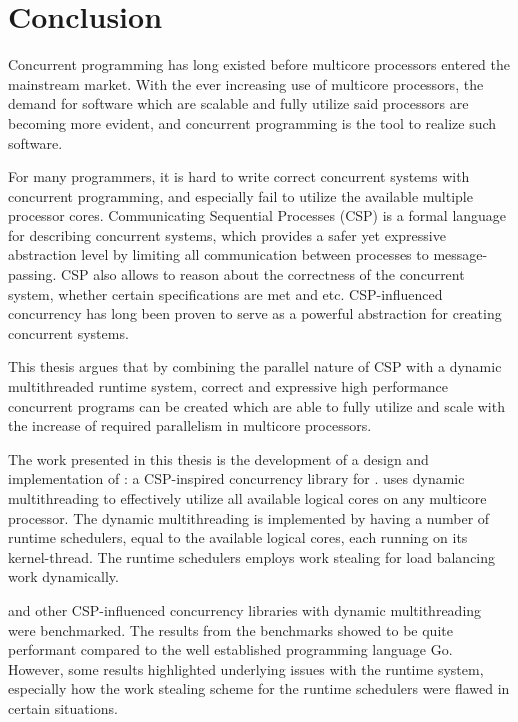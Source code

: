 

\chapter{Conclusion}
\label{ch:conclusion}

Concurrent programming has long existed before multicore processors entered the mainstream market. With the ever increasing use of multicore processors, the demand for software which are scalable and fully utilize said processors are becoming more evident, and concurrent programming is the tool to realize such software.

For many programmers, it is hard to write correct concurrent systems with concurrent programming, and especially fail to utilize the available multiple processor cores. Communicating Sequential Processes (CSP) is a formal language for describing concurrent systems, which provides a safer yet expressive abstraction level by limiting all communication between processes to message\hyp{}passing. CSP also allows to reason about the correctness of the concurrent system, whether certain specifications are met and etc. CSP\hyp{}influenced concurrency has long been proven to serve as a powerful abstraction for creating concurrent systems.

This thesis argues that by combining the parallel nature of CSP with a dynamic multithreaded runtime system, correct and expressive high performance concurrent programs can be created which are able to fully utilize and scale with the increase of required parallelism in multicore processors.

The work presented in this thesis is the development of a design and implementation of \Proxc{}: a CSP\hyp{}inspired concurrency library for \Cpp{}. \Proxc{} uses dynamic multithreading to effectively utilize all available logical cores on any multicore processor. The dynamic multithreading is implemented by having a number of runtime schedulers, equal to the available logical cores, each running on its kernel\hyp{}thread. The runtime schedulers employs work stealing for load balancing work dynamically. 

\Proxc{} and other CSP\hyp{}influenced concurrency libraries with dynamic multithreading were benchmarked. The results from the benchmarks showed \Proxc{} to be quite performant compared to the well established programming language Go. However, some results highlighted underlying issues with the runtime system, especially how the work stealing scheme for the runtime schedulers were flawed in certain situations.

